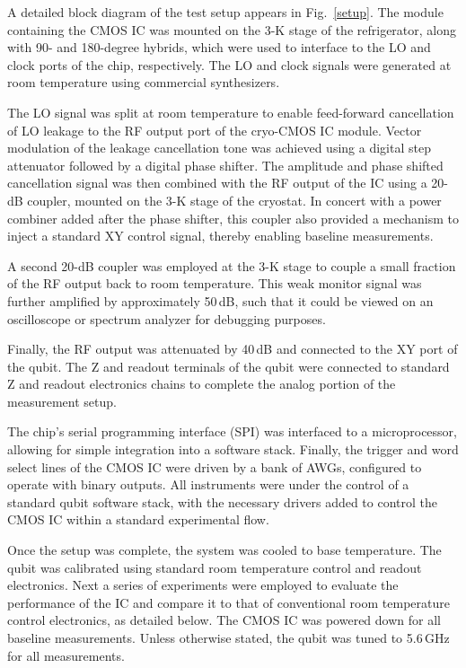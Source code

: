 \documentclass[journal]{IEEEtran}
\newcommand{\CR}[1]{{\color{black}#1}}
\begin{document}
A detailed block diagram of the test setup appears in Fig.~\ref{setup}. The module containing the CMOS IC was mounted on the 3-K stage of the refrigerator, along with 90- and 180-degree hybrids, which were used to interface to the LO and clock ports of the chip, respectively. The LO and clock signals were generated at room temperature using commercial synthesizers. 

The LO signal was split at room temperature to enable feed-forward cancellation of LO leakage to the RF output port of the cryo-CMOS IC module. Vector modulation of the leakage cancellation tone was achieved using a digital step attenuator followed by a digital phase shifter. The amplitude and phase shifted cancellation signal was then combined with the RF output of the IC using a 20-dB coupler, mounted on the 3-K stage of the cryostat.  In concert with a power combiner added after the phase shifter, this coupler also provided a mechanism to inject a standard XY control signal, thereby enabling baseline measurements.

A second 20-dB coupler was employed at the 3-K stage to couple a small fraction of the RF output back to room temperature. This weak monitor signal was further amplified by approximately 50\,dB, such that it could be viewed on an oscilloscope or spectrum analyzer for debugging purposes. 

Finally, the RF output was attenuated by 40\,dB and connected to the XY port of the qubit. The Z and readout terminals of the qubit were connected to standard Z and readout electronics chains to complete the analog portion of the measurement setup. 

The \CR{chip's serial programming interface (SPI)} was interfaced to a microprocessor, allowing for simple integration into a software stack. Finally, the trigger and word select lines of the CMOS IC were driven by a bank of AWGs, configured to operate with binary outputs. All instruments were under the control of a standard qubit software stack, with the necessary drivers added to control the CMOS IC within a standard experimental flow. 

Once the setup was complete, the system was cooled to base temperature. The qubit was calibrated using  standard room temperature control and readout electronics.  Next a series of experiments were employed to evaluate the performance of the IC and compare it to that of conventional room temperature control electronics, as detailed below. The CMOS IC was powered down for all baseline measurements. Unless otherwise stated,  the qubit was tuned to 5.6\,GHz for all measurements. 
\end{document}
